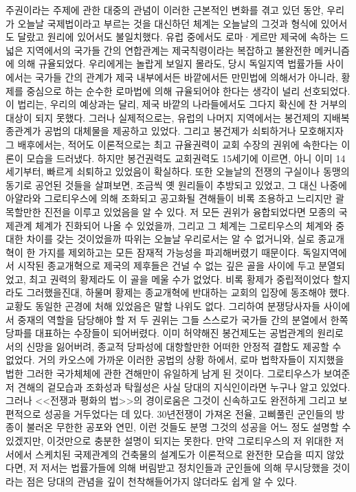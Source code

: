 주권이라는 주제에 관한 대중의 관념이 이러한 근본적인 변화를 겪고 있던 동안,
우리가 오늘날 국제법이라고 부르는 것을 대신하던 체계는
오늘날의 그것과 형식에 있어서도 달랐고 원리에 있어서도 불일치했다.
유럽 중에서도 로마^^b7게르만 제국에 속하는 드넓은 지역에서의
국가들 간의 연합관계는 제국칙령이라는 복잡하고 불완전한 메커니즘에 의해
규율되었다.
우리에게는 놀랍게 보일지 몰라도, 당시 독일지역 법률가들 사이에서는
국가들 간의 관계가 제국 내부에서든 바깥에서든
만민법에 의해서가 아니라,
황제를 중심으로 하는 순수한 로마법에 의해
규율되어야 한다는 생각이 널리 선호되었다.
이 법리는, 우리의 예상과는 달리,
제국 바깥의 나라들에서도
그다지 확신에 찬 거부의 대상이 되지 못했다.
그러나 실제적으로는, 유럽의 나머지 지역에서는
봉건제의 지배복종관계가 공법의 대체물을 제공하고 있었다.
그리고 봉건제가 쇠퇴하거나 모호해지자 그 배후에서는,
적어도 이론적으로는 최고 규율권력이 교회 수장의 권위에 속한다는 이론이
모습을 드러냈다.
하지만 봉건권력도 교회권력도 15세기에 이르면, 아니 이미 14세기부터,
빠르게 쇠퇴하고 있었음이 확실하다.
또한
오늘날의 전쟁의 구실이나 동맹의 동기로 공언된 것들을 살펴보면,
조금씩 옛 원리들이 추방되고 있었고,
그 대신 나중에 아얄라와 그로티우스에 의해 조화되고 공고화될 견해들이
비록 조용하고 느리지만
괄목할만한 진전을 이루고 있었음을 알 수 있다.
저 모든 권위가 융합되었다면 모종의 국제관계 체계가 진화되어 나올 수 있었을까,
그리고 그 체계는 그로티우스의 체계와 중대한 차이를 갖는 것이었을까 따위는
오늘날 우리로서는 알 수 없거니와, 실로 종교개혁이 한 가지를 제외하고는
모든 잠재적 가능성을 파괴해버렸기 때문이다.
독일지역에서 시작된 종교개혁으로 제국의 제후들은 건널 수 없는 깊은 골을
사이에 두고 분열되었고, 최고 권력의 황제라도
이 골을 메울 수가 없었다.
비록 황제가 중립적이었다 할지라도 그러했을진대,
하물며 황제는 종교개혁에 반대하는 교회의 입장에 동조해야 했다.
교황도 동일한 곤경에 처해 있었음은 말할 나위도 없다.
그리하여 분쟁당사자들 사이에서 중재의 역할을 담당해야 할 저 두 권위는
그들 스스로가 국가들 간의 분열에서 한쪽 당파를 대표하는 수장들이 되어버렸다.
이미 허약해진 봉건제도는 공법관계의 원리로서의 신망을 잃어버려,
종교적 당파성에 대항할만한 어떠한 안정적 결합도 제공할 수 없었다.
거의 카오스에 가까운 이러한 공법의 상황 하에서,
로마 법학자들이 지지했을 법한 그러한 국가체체에 관한 견해만이
유일하게 남게 된 것이다.
그로티우스가 보여준 저 견해의 겉모습과 조화성과 탁월성은
사실 당대의 지식인이라면 누구나 알고 있었다.
그러나 <<전쟁과 평화의 법>>의 경이로움은
그것이 신속하고도 완전하게 그리고 보편적으로 성공을 거두었다는 데 있다.
30년전쟁이 가져온 전율, 고삐풀린 군인들의 방종이 불러온 무한한 공포와 연민,
이런 것들도 분명 그것의 성공을 어느 정도 설명할 수 있겠지만,
이것만으로 충분한 설명이 되지는 못한다.
만약 그로티우스의 저 위대한 저서에서 스케치된 국제관계의 건축물의 설계도가
이론적으로 완전한 모습을 띠지 않았다면,
저 저서는 법률가들에 의해 버림받고
정치인들과 군인들에 의해 무시당했을 것이라는 점은
당대의 관념을 깊이 천착해들어가지 않더라도 쉽게 알 수 있다.

